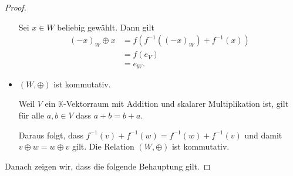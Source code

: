 \documentclass[12pt]{extarticle}
\newcommand{\ib}[1]{\boldsymbol{\mathit{#1}}}
\newcommand{\mg}[1]{\mathbb{#1}}
\begin{document}
\begin{proof}
\begin{itemize}
    Sei \(\ib{x} \in W\) beliebig gewählt.  Dann gilt
\begin{align*}
  (\ib{-x})_{W} \oplus \ib{x}
  &= f(f^{-1}((\ib{-x})_W) + f^{-1}(\ib{x}))\\
  &= f(\ib{e}_V) \tag*{Wegen (3)}\\
  &= \ib{e}_W. \tag*{Wegen (2)}
\end{align*}
  \item \((W, \oplus)\) ist kommutativ.

    Weil \(V\) ein \(\mg{K}\)-Vektorraum mit Addition und skalarer
    Multiplikation ist, gilt für alle \(\ib{a}, \ib{b} \in V\)
    dass \(\ib{a}+\ib{b}=\ib{b}+\ib{a}\).

    Daraus folgt, dass
    \(f^{-1}(\ib{v})+f^{-1}(\ib{w})=f^{-1}(\ib{w})+f^{-1}(\ib{v})\)
    und damit
    \(\ib{v} \oplus \ib{w} = \ib{w} \oplus \ib{v}\)
    gilt.  Die Relation \((W, \oplus)\) ist kommutativ.
  \end{itemize}

  Danach zeigen wir, dass die folgende Behauptung gilt.


\end{proof}
\end{document}

